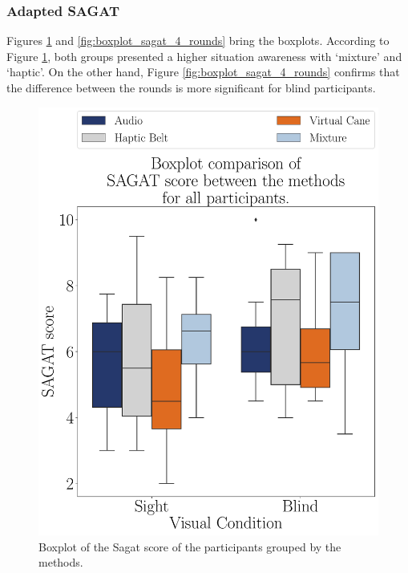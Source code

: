 \subsubsection{Adapted SAGAT}
\label{subsubsec:results_adapted_sagat_2}

Figures \ref{fig:boxplot_sagat_4_scene} and \ref{fig:boxplot_sagat_4_rounds} bring the boxplots. According to Figure \ref{fig:boxplot_sagat_4_scene}, both groups presented a higher situation awareness with ‘mixture’ and ‘haptic’. On the other hand, Figure \ref{fig:boxplot_sagat_4_rounds} confirms that the difference between the rounds is more significant for blind participants. 

\begin{figure}[!htb]
    \centering
    \includegraphics[width = 0.75\linewidth]{3 - Resultados//Figuras/boxplot_sagat_4_scene.pdf}
    \caption{Boxplot of the Sagat score of the participants grouped by the methods.}
    \label{fig:boxplot_sagat_4_scene}
\end{figure}
